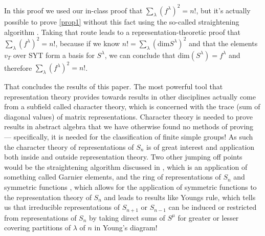 \documentclass[11 pt]{amsart}
\theoremstyle{plain}   %
\theoremstyle{definition}
\theoremstyle{remark}
\numberwithin{equation}{section}
\def\dim{\mathrm{dim}}
\begin{document}
In this proof we used our in-class proof that $\sum_\lambda(f^\lambda)^2 = n!$, but it's actually possible to prove \cref{prop1}
without this fact using the so-called straightening algorithm \cite[Chapter 7.4]{fulton}.
Taking that route leads to a representation-theoretic proof that $\sum_\lambda(f^\lambda)^2 = n!$,
because if we know $n! = \sum_\lambda (\dim S^\lambda)^2$ and that the elements $v_T$ over SYT form a basis for $S^\lambda$,
we can conclude that $\dim(S^\lambda) = f^\lambda$ and therefore $\sum_\lambda(f^\lambda)^2 = n!$. \par
That concludes the results of this paper. The most powerful tool that representation theory provides towards results in other disciplines
actually come from a subfield called character theory, which is concerned with the trace (sum of diagonal values) of matrix representations.
Character theory is needed to prove results in abstract algebra that we have otherwise found no methods of proving --- specifically, it
is needed for the classification of finite simple groups! As such the character theory of representations of $S_n$ is of great interest
and application both inside and outside representation theory. Two other jumping off points would be the straightening algorithm
discussed in \cite[Chapter 7.4]{fulton}, which is an application of something called Garnier elements, and the ring of
representations of $S_n$ and symmetric functions \cite[7.3]{fulton}, which allows for the application of symmetric functions
to the representation theory of $S_n$ and leads to results like Youngs rule, which tells us that irreducible representations of
$S_{n+1}$ or $S_{n-1}$ can be induced or restricted from representations of $S_n$ by taking direct sums of $S^\mu$ for greater or lesser covering partitions
of $\lambda$ of $n$ in Young's diagram!








\end{document}
